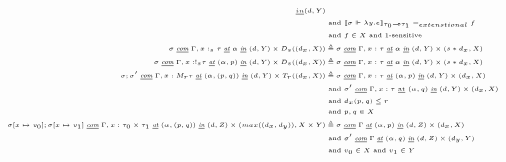 \begin{definition}
\begin{equation}
\begin{tiny}
\begin{aligned}[c]
{        \underline{in} } (d, Y) \\
      & \text{ and } \llbracket \sigma \Vdash \lambda y . e \rrbracket_{\tau_0
      \multimap \tau_1} =_{extenstional} f \\
      & \text{ and } f \in X \text{ and 1-sensitive} \\
      \sigma \textit{ \underline{com} } \Gamma, x:_s \tau \textit{
        \underline{at} } \alpha \textit{ \underline{in} } (d, Y) \times D_s
      ((d_x, X)) &\triangleq \sigma \textit{ \underline{com} } \Gamma, x : \tau
      \textit{ \underline{at} } \alpha \textit{ \underline{in} } (d, Y) \times
      (s * d_x, X) \\
      \sigma \textit{ \underline{com} } \Gamma, x: !_s \tau \textit{
        \underline{at} } (\alpha, p) \textit{ \underline{in} } (d, Y) \times D_s
      ((d_x, X)) &\triangleq \sigma \textit{ \underline{com} } \Gamma, x : \tau
      \textit{ \underline{at} } \alpha \textit{ \underline{in} } (d, Y) \times
      (s * d_x, X) \\
      \sigma; \sigma' \textit{ \underline{com} } \Gamma, x: M_r \tau \textit{ \underline{at} } (\alpha, (p, q)) \textit{ \underline{in} } (d, Y) \times T_r ((d_x, X)) &\triangleq 
      \sigma \textit{ \underline{com} } \Gamma, x : \tau \textit{ \underline{at} } (\alpha, p) \textit{ \underline{in} } (d, Y) \times (d_x, X) \\
      & \text{ and } \sigma' \textit{ \underline{com} } \Gamma, x : \tau \text{ \underline{at} } (\alpha, q) \textit{ \underline{in} } (d, Y) \times (d_x, X) \\
      & \text{ and } d_x (p, q) \leq r \\
      & \text{ and } p, q \in X \\
      \sigma[x \mapsto v_0];\sigma[x \mapsto v_1] \textit{ \underline{com} }
      \Gamma, x : \tau_0 \times \tau_1 \textit{ \underline{at} } (\alpha, (p,
      q)) \textit{ \underline{in} } (d, Z) \times (max((d_x, d_y)), X
      \times Y) &\triangleq
      \sigma \textit{ \underline{com} } \Gamma \textit{
        \underline{at} } (\alpha, p) \textit{ \underline{in} } (d, Z) \times
      (d_x, X) \\
      & \text{ and } \sigma' \textit{ \underline{com} } \Gamma \textit{
        \underline{at} } (\alpha, q) \textit{ \underline{in} } (d, Z) \times (d_y, Y)
      \\
      & \text{ and } v_0 \in X \text{ and } v_1 \in Y \\

\end{aligned}
\end{tiny}
\end{equation}
\end{definition}
